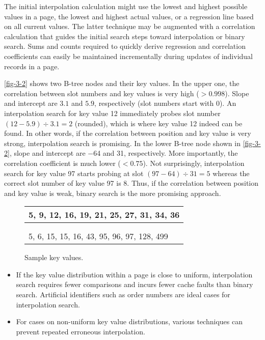 The initial interpolation calculation might use the lowest and highest
possible values in a page, the lowest and highest actual values, or a
regression line based on all current values. The latter technique may be
augmented with a correlation calculation that guides the initial search
steps toward interpolation or binary search. Sums and counts required to
quickly derive regression and correlation coefficients can easily be
maintained incrementally during updates of individual records in a page.

\autoref{fig-3-2} shows two B-tree nodes and their key values. In the upper
one, the correlation between slot numbers and key values is very high
($> 0.998$). Slope and intercept are $3.1$ and $5.9$,
respectively (slot numbers start with 0). An interpolation search for
key value 12 immediately probes slot number $(12 − 5.9) \div
3.1 = 2$ (rounded), which is where key value 12 indeed can be
found. In other words, if the correlation between position and key value
is very strong, interpolation search is promising. In the lower B-tree
node shown in \autoref{fig-3-2}, slope and intercept are −64 and 31,
respectively. More importantly, the correlation coefficient is much
lower ($< 0.75$). Not surprisingly, interpolation search
for key value 97 starts probing at slot $(97 − 64) \div 31 = 5$ whereas the
correct slot number of key value 97 is 8. Thus, if the correlation
between position and key value is weak, binary search is the more
promising approach.

\begin{figure}
  \centering
  \begin{tabular}{l}
    \hline
    \multicolumn{1}{|l|}{5, 9, 12, 16, 19, 21, 25, 27, 31, 34, 36} \\
    \hline\\
    \\
    \hline
    \multicolumn{1}{|l|}{5, 6, 15, 15, 16, 43, 95, 96, 97, 128, 499} \\
    \hline
  \end{tabular}
  \caption{Sample key values.\label{fig-3-2}}
\end{figure}

\begin{itemize}
\item
  If the key value distribution within a page is close to uniform,
  interpolation search requires fewer comparisons and incurs fewer cache
  faults than binary search. Artificial identifiers such as order
  numbers are ideal cases for interpolation search.
\item
  For cases on non-uniform key value distributions, various techniques
  can prevent repeated erroneous interpolation.
\end{itemize}

